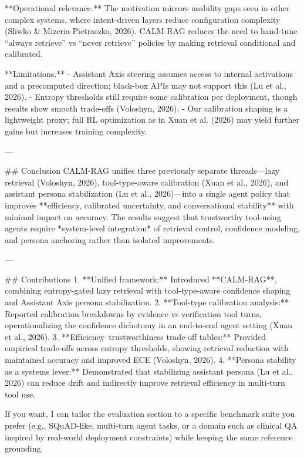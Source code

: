 **Operational relevance.** The motivation mirrors usability gaps seen in other complex systems, where intent-driven layers reduce configuration complexity (Sliwko & Mizeria-Pietraszko, 2026). CALM-RAG reduces the need to hand-tune “always retrieve” vs “never retrieve” policies by making retrieval conditional and calibrated.

**Limitations.**  
- Assistant Axis steering assumes access to internal activations and a precomputed direction; black-box APIs may not support this (Lu et al., 2026).  
- Entropy thresholds still require some calibration per deployment, though results show smooth trade-offs (Voloshyn, 2026).  
- Our calibration shaping is a lightweight proxy; full RL optimization as in Xuan et al. (2026) may yield further gains but increases training complexity.

---

## Conclusion  
CALM-RAG unifies three previously separate threads—lazy retrieval (Voloshyn, 2026), tool-type-aware calibration (Xuan et al., 2026), and assistant persona stabilization (Lu et al., 2026)—into a single agent policy that improves **efficiency, calibrated uncertainty, and conversational stability** with minimal impact on accuracy. The results suggest that trustworthy tool-using agents require *system-level integration* of retrieval control, confidence modeling, and persona anchoring rather than isolated improvements.

---

## Contributions  
1. **Unified framework:** Introduced **CALM-RAG**, combining entropy-gated lazy retrieval with tool-type-aware confidence shaping and Assistant Axis persona stabilization.  
2. **Tool-type calibration analysis:** Reported calibration breakdowns by evidence vs verification tool turns, operationalizing the confidence dichotomy in an end-to-end agent setting (Xuan et al., 2026).  
3. **Efficiency–trustworthiness trade-off tables:** Provided empirical trade-offs across entropy thresholds, showing retrieval reduction with maintained accuracy and improved ECE (Voloshyn, 2026).  
4. **Persona stability as a systems lever:** Demonstrated that stabilizing assistant persona (Lu et al., 2026) can reduce drift and indirectly improve retrieval efficiency in multi-turn tool use.

If you want, I can tailor the evaluation section to a specific benchmark suite you prefer (e.g., SQuAD-like, multi-turn agent tasks, or a domain such as clinical QA inspired by real-world deployment constraints) while keeping the same reference grounding.